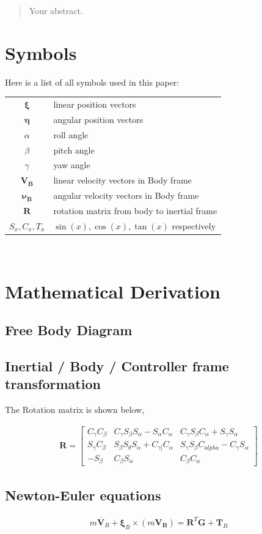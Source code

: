 \begin{abstract}
Your abstract.
\end{abstract}
\section{Symbols}
Here is a list of all symbols used in this paper:
\\
\begin{tabular}{c p{}}
  $\bm{\xi}$ & linear position vectors  \\
  $\bm{\eta}$ & angular position vectors \\
  $\alpha$ & roll angle \\
  $\beta$ & pitch angle \\
  $\gamma$ & yaw angle \\
  $\bm{V_B}$ & linear velocity vectors in Body frame\\
  $\bm{\nu_B}$ & angular velocity vectors in Body frame\\
  $\bm{R}$ & rotation matrix from body to inertial frame\\
  $S_x, C_x, T_x$ & $\sin(x), \cos(x), \tan(x)$ respectively \\
\end{tabular}\\
\section{Mathematical Derivation}
\subsection{Free Body Diagram}
\subsection{Inertial / Body / Controller frame transformation}
The Rotation matrix is shown below,

\begin{align*}
  \bm{R} =
  \begin{bmatrix}
    C_{\gamma}C_{\beta} & C_{\gamma}S_{\beta}S_{\alpha} - S_{\alpha}C_{\alpha} & C_{\gamma}S_{\beta}C_{\alpha} + S_{\gamma}S_{\alpha} \\
    S_{\gamma}C_{\beta} & S_{\beta}S_{\theta}S_{\alpha} + C_{\gamma]}C_{\alpha} & S_{\gamma}S_{\beta}C_{alpha} - C_{\gamma}S_{\alpha} \\
    -S_{\beta} & C_{\beta}S_{\alpha} & C_{\beta}C_{\alpha}
  \end{bmatrix}
\end{align*}
\subsection{Newton-Euler equations}
\begin{align*}
  m\dot{\bm{V}_B} + \bm{\xi}_B \times (m \bm{V_B}) = \bm{R}^T \bm{G} + \bm{T}_B
\end{align*}
